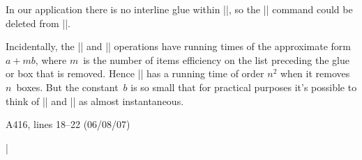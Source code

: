 In our application there is no interline glue within |\box\footins|,
so the |\unskip| command could be deleted from |\removehboxes|.

Incidentally, the |\unskip| and |\lastbox| operations have running
times of the approximate form
$a+mb$, where $m$~is the number of items {efficiency} on the
list preceding the glue or box that is removed. Hence |\removehboxes| has a
running time of order $n^2$ when it removes $n$~boxes.
But the constant~$b$ is so small that
for practical purposes it's possible to think of\/ |\unskip| and
|\lastbox| as almost instantaneous.

\bugonpage A416, lines 18--22 (06/08/07)

\ninepoint\noindent\beginlines
|\def\leftheadline{\hbox to \pagewidth{\spaceskip=0pt|
|    \vbox to 10pt{}%
|    \llap{\tenbf\folio\kern1pc}%
|    \tenit\rhead\hfil}} %
